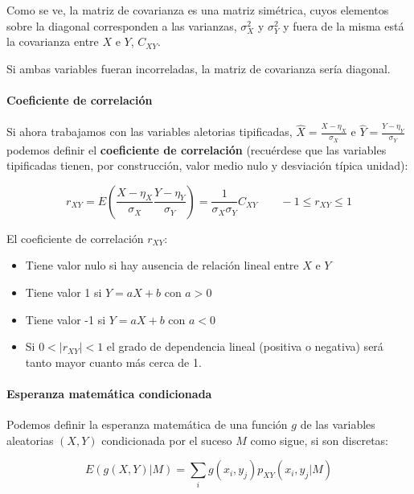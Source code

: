 \documentclass[11pt]{article}
\providecommand{\tightlist}{%
      \setlength{\itemsep}{0pt}\setlength{\parskip}{0pt}}
\begin{document}
Como se ve, la matriz de covarianza es una matriz simétrica, cuyos
elementos sobre la diagonal corresponden a las varianzas, \(\sigma_X^2\)
y \(\sigma_Y^2\) y fuera de la misma está la covarianza entre \(X\) e
\(Y\), \(C_{XY}\).

Si ambas variables fueran incorreladas, la matriz de covarianza sería
diagonal.

    \hypertarget{coeficiente-de-correlaciuxf3n}{%
\paragraph{Coeficiente de
correlación}\label{coeficiente-de-correlaciuxf3n}}

Si ahora trabajamos con las variables aletorias tipificadas,
\(\hat X = \frac{X-\eta_X}{\sigma_X}\) e
\(\hat Y = \frac{Y-\eta_Y}{\sigma_Y}\) podemos definir el
\textbf{coeficiente de correlación} (recuérdese que las variables
tipificadas tienen, por construcción, valor medio nulo y desviación
típica unidad):

\[r_{XY}=E(\frac{X-\eta_X}{\sigma_X} \frac{Y-\eta_Y}{\sigma_Y})=\frac{1}{\sigma_X\sigma_Y}C_{XY}  \qquad -1 \leq r_{XY} \leq 1\]

El coeficiente de correlación \(r_{XY}\):

\begin{itemize}
\tightlist
\item
  Tiene valor nulo si hay ausencia de relación lineal entre \(X\) e
  \(Y\)
\item
  Tiene valor 1 si \(Y = aX +b\) con \(a>0\)
\item
  Tiene valor -1 si \(Y = aX +b\) con \(a<0\)
\item
  Si \(0<|r_{XY}|<1\) el grado de dependencia lineal (positiva o
  negativa) será tanto mayor cuanto más cerca de 1.
\end{itemize}

    \hypertarget{esperanza-matemuxe1tica-condicionada}{%
\paragraph{Esperanza matemática
condicionada}\label{esperanza-matemuxe1tica-condicionada}}

Podemos definir la esperanza matemática de una función \(g\) de las
variables aleatorias \((X,Y)\) condicionada por el suceso \(M\) como
sigue, si son discretas:

\[E(g(X,Y) | M)=\sum_i g(x_i,y_j)p_{XY}(x_i,y_j | M)\]
\end{document}
